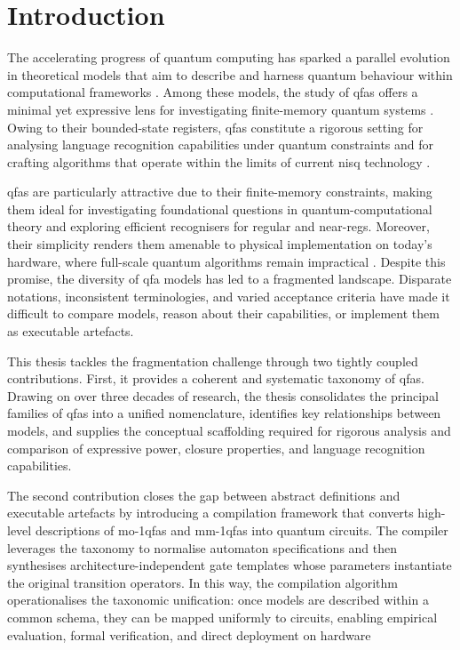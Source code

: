\chapter{Introduction}
\label{chap:introduction}

The accelerating progress of quantum computing has sparked a parallel evolution in theoretical models that aim to describe and harness quantum behaviour within computational frameworks \cite{deutsch1985quantum}. Among these models, the study of \glspl{qfa} offers a minimal yet expressive lens for investigating finite-memory quantum systems \cite{ambainis19981,moore2000quantum}. Owing to their bounded-state registers, \glspl{qfa} constitute a rigorous setting for analysing language recognition capabilities under quantum constraints and for crafting algorithms that operate within the limits of current \gls{nisq} technology \cite{preskill2018quantum}.

\Glspl{qfa} are particularly attractive due to their finite-memory constraints, making them ideal for investigating foundational questions in quantum-computational theory and exploring efficient recognisers for regular and near-\gls{reg}s. Moreover, their simplicity renders them amenable to physical implementation on today's hardware, where full-scale quantum algorithms remain impractical \cite{arute2019quantum}. Despite this promise, the diversity of \gls{qfa} models has led to a fragmented landscape. Disparate notations, inconsistent terminologies, and varied acceptance criteria have made it difficult to compare models, reason about their capabilities, or implement them as executable artefacts.

This thesis tackles the fragmentation challenge through two tightly coupled contributions. First, it provides a coherent and systematic taxonomy of \glspl{qfa}. Drawing on over three decades of research, the thesis consolidates the principal families of \glspl{qfa} into a unified nomenclature, identifies key relationships between models, and supplies the conceptual scaffolding required for rigorous analysis and comparison of expressive power, closure properties, and language recognition capabilities.

The second contribution closes the gap between abstract definitions and executable artefacts by introducing a compilation framework that converts high-level descriptions of \glspl{mo-1qfa} and \glspl{mm-1qfa} into quantum circuits. The compiler leverages the taxonomy to normalise automaton specifications and then synthesises architecture-independent gate templates whose parameters instantiate the original transition operators. In this way, the compilation algorithm operationalises the taxonomic unification: once models are described within a common schema, they can be mapped uniformly to circuits, enabling empirical evaluation, formal verification, and direct deployment on hardware

